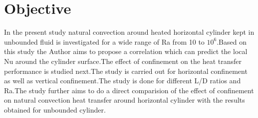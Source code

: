\chapter{Objective}



In the present study natural convection around heated horizontal cylinder kept in unbounded fluid is investigated for a wide range of Ra from 10 to $10^6$.Based on this study the Author aims to propose a correlation which can predict the local Nu around the cylinder surface.The effect of confinement on the heat transfer performance is studied next.The study is carried out for horizontal confinement as well as vertical confinement.The study is done for different L/D ratios and Ra.The study further aims to do a direct comparision of the effect of confinement on natural convection heat transfer around horizontal cylinder with the results obtained for unbounded cylinder.